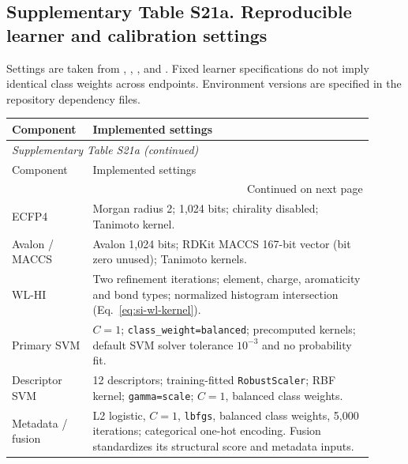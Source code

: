 \subsection*{Supplementary Table S21a. Reproducible learner and calibration settings}

Settings are taken from , , ,  and . Fixed learner specifications do not imply identical class weights across endpoints. Environment versions are specified in the repository dependency files.

\begingroup\small\setlength{\tabcolsep}{4pt}

\begin{longtable}{p{0.19\linewidth}p{0.72\linewidth}}

\toprule Component & Implemented settings \\ \midrule\endfirsthead

\multicolumn{2}{l}{\textit{Supplementary Table S21a (continued)}} \\

\toprule Component & Implemented settings \\ \midrule\endhead

\midrule\multicolumn{2}{r}{Continued on next page}\\\endfoot\bottomrule\endlastfoot

ECFP4 & Morgan radius 2; 1,024 bits; chirality disabled; Tanimoto kernel. \\

Avalon / MACCS & Avalon 1,024 bits; RDKit MACCS 167-bit vector (bit zero unused); Tanimoto kernels. \\

WL-HI & Two refinement iterations; element, charge, aromaticity and bond types; normalized histogram intersection (Eq.~\eqref{eq:si-wl-kernel}). \\

Primary SVM & $C=1$; \texttt{class\_weight=balanced}; precomputed kernels; default SVM solver tolerance $10^{-3}$ and no probability fit. \\

Descriptor SVM & 12 descriptors; training-fitted \texttt{RobustScaler}; RBF kernel; \texttt{gamma=scale}; $C=1$, balanced class weights. \\

Metadata / fusion & L2 logistic, $C=1$, \texttt{lbfgs}, balanced class weights, 5,000 iterations; categorical one-hot encoding. Fusion standardizes its structural score and metadata inputs. \\


\end{longtable}
